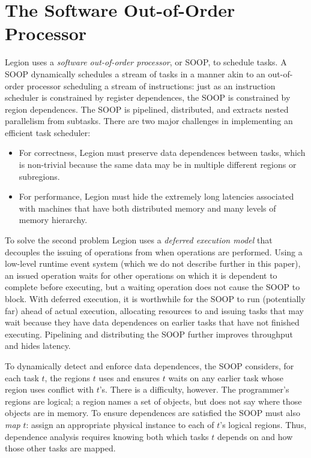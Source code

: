 \section{The Software Out-of-Order Processor}
\label{sec:soop}

Legion uses a {\em  software out-of-order processor}, or SOOP, to schedule tasks.  A SOOP 
dynamically schedules a stream of tasks in a manner akin to an out-of-order processor scheduling a stream of instructions:
just as an instruction scheduler is constrained by register dependences,
the SOOP is constrained by region dependences.
The SOOP  is pipelined, distributed, and extracts nested parallelism from subtasks.
There are two major challenges in implementing an efficient task scheduler:
\begin{itemize}
\item  For correctness, Legion must preserve data dependences between tasks, which is non-trivial
because the same data may be in multiple different regions or subregions.
  
\item For performance, Legion must hide the extremely long latencies associated
  with machines that have both distributed memory and many levels of
  memory hierarchy.
\end{itemize}

To solve the second problem Legion uses a {\em deferred execution model} that decouples the issuing
of operations from when operations are performed.  Using a low-level runtime event system (which we do
not describe further in this paper), an issued operation waits for other operations on
which it is dependent to complete before executing, but a waiting operation does not cause the SOOP
to block.  With deferred execution, it is worthwhile for the SOOP to run (potentially far) ahead of actual execution,
allocating resources to and issuing tasks that may wait because they have data dependences on earlier tasks that have not 
finished executing.   Pipelining and distributing the SOOP further improves throughput and hides latency.

To dynamically detect and enforce data dependences,
the SOOP considers, for each task $t$, the
regions $t$ uses and ensures $t$ waits on any
earlier task whose region uses conflict with $t$'s.  There is a
difficulty, however.  The programmer's regions are logical; a region
names a set of objects, but does not say where those objects
are in memory.  To ensure dependences are satisfied the SOOP must also {\em map} $t$: assign an
appropriate physical instance to each of $t$'s logical regions.  Thus, dependence
analysis requires knowing both which tasks $t$ depends on and how those
other tasks are mapped.

